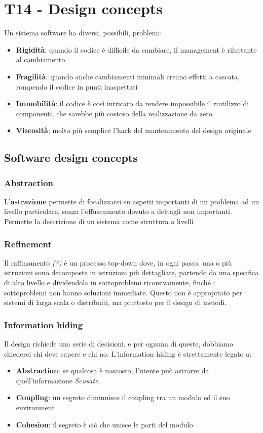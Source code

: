 \documentclass[11pt]{article}
\begin{document}
\section{T14 - Design concepts}
Un sistema software ha diversi, possibili, problemi: 
\begin{itemize}
    \item \textbf{Rigidità}: quando il codice è difficile da cambiare, il management è riluttante al cambiamento 
    \item \textbf{Fragilità}: quando anche cambiamenti minimali creano effetti a cascata, rompendo il codice in punti inaspettati 
    \item \textbf{Immobilità}: il codice è così intricato da rendere impossibile il riutilizzo di componenti, che sarebbe più costoso della realizzazione da zero
    \item \textbf{Viscosità}: molto più semplice l'hack del mantenimento del design originale
\end{itemize}
\subsection{Software design concepts}
\subsubsection{Abstraction}
L'\textbf{astrazione} permette di focalizzarsi su aspetti importanti di un problema ad un livello particolare, senza l'offuscamento dovuto a dettagli non importanti. Permette la descrizione di un sistema come struttura a livelli 
\subsubsection{Refinement} 
Il raffinamento \textit{(?)} è un processo top-down dove, in ogni passo, una o più istruzioni sono decomposte in istruzioni più dettagliate, partendo da una specifica di alto livello e dividendola in sottoproblemi ricorsivamente, finché i sottoproblemi non hanno soluzioni immediate. Questo non è appropriato per sistemi di larga scala o distribuiti, ma piuttosto per il design di metodi. 
\subsubsection{Information hiding}
Il design richiede una serie di decisioni, e per ognuna di queste, dobbiamo chiederci chi deve sapere e chi no. L'information hiding è strettamente legato a:
\begin{itemize}
    \item \textbf{Abstraction}: se qualcosa è nascosto, l'utente può astrarre da quell'informazione \textit{Scusate.}
    \item \textbf{Coupling}: un segreto diminuisce il coupling tra un modulo ed il suo environment 
    \item \textbf{Cohesion}: il segreto è ciò che unisce le parti del modulo 
\end{itemize}
\end{document}
